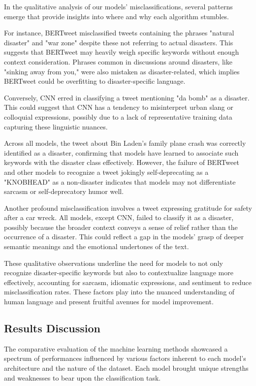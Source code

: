 \documentclass[10pt,table]{article}
\begin{document}
In the qualitative analysis of our models' misclassifications, several patterns emerge that provide insights into where and why each algorithm stumbles. 

For instance, BERTweet misclassified tweets containing the phrases "natural disaster" and "war zone" despite these not referring to actual disasters. This suggests that BERTweet may heavily weigh specific keywords without enough context consideration. Phrases common in discussions around disasters, like "sinking away from you," were also mistaken as disaster-related, which implies BERTweet could be overfitting to disaster-specific language.

Conversely, CNN erred in classifying a tweet mentioning "da bomb" as a disaster. This could suggest that CNN has a tendency to misinterpret urban slang or colloquial expressions, possibly due to a lack of representative training data capturing these linguistic nuances. 

Across all models, the tweet about Bin Laden's family plane crash was correctly identified as a disaster, confirming that models have learned to associate such keywords with the disaster class effectively. However, the failure of BERTweet and other models to recognize a tweet jokingly self-deprecating as a "KNOBHEAD" as a non-disaster indicates that models may not differentiate sarcasm or self-deprecatory humor well.

Another profound misclassification involves a tweet expressing gratitude for safety after a car wreck. All models, except CNN, failed to classify it as a disaster, possibly because the broader context conveys a sense of relief rather than the occurrence of a disaster. This could reflect a gap in the models' grasp of deeper semantic meanings and the emotional undertones of the text.

These qualitative observations underline the need for models to not only recognize disaster-specific keywords but also to contextualize language more effectively, accounting for sarcasm, idiomatic expressions, and sentiment to reduce misclassification rates. These factors play into the nuanced understanding of human language and present fruitful avenues for model improvement.


\subsection{Results Discussion}
The comparative evaluation of the machine learning methods showcased a spectrum of performances influenced by various factors inherent to each model's architecture and the nature of the dataset. Each model brought unique strengths and weaknesses to bear upon the classification task.
\end{document}
